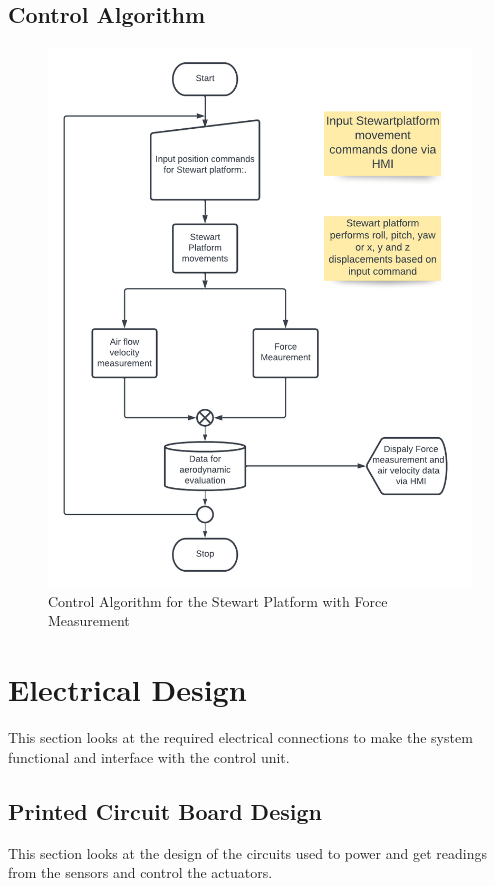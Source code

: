 \subsection{Control Algorithm}
\begin{center}
	\begin{figure}[H]
	\centering
	\includegraphics[width=0.7\linewidth]{Figures/Flow}
	\caption[Control Algorithm]{Control Algorithm for the Stewart Platform with Force Measurement}
	\end{figure}
\end{center}
\section{Electrical Design}
This section looks at the required electrical connections to make the system functional and interface with the control unit.
\subsection{Printed Circuit Board Design}
This section looks at the design of the circuits used to power and get readings from the sensors and control the actuators.

